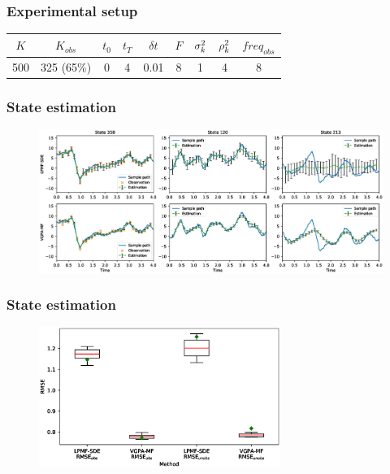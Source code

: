 \begin{frame}[t]
    \frametitle{Experimental setup}
    \begin{table}
        \centering
        \label{table-lorenz-96-setup}
        \begin{tabular}{|c|c|c|c|c|c|c|c|c|}
        \hline
        $K$ & $K_{obs}$ & $t_0$ & $t_T$ & $\delta t$ & $F$ & $\sigma_{k}^2$  & $\rho_{k}^2$ & $freq_{obs}$ \\ \hline
        500 & 325 (65\%) & 0 & 4 & 0.01 & 8 & 1 & 4 & 8 \\ \hline
        \end{tabular}
    \end{table}
\end{frame}

\begin{frame}[t]
    \frametitle{State estimation}
    \begin{figure}
        \centering
        \includegraphics[width=\textwidth]{graphics/lorenz-96-states}
        \label{fig-lorenz-96-states}
    \end{figure}
\end{frame}

\begin{frame}[t]
    \frametitle{State estimation}
    \begin{figure}
        \centering
        \includegraphics[width=0.7\textwidth]{graphics/lorenz-96-states-boxplot}    
        \label{fig-lorenz-96-state-boxplot}
    \end{figure}
\end{frame}

